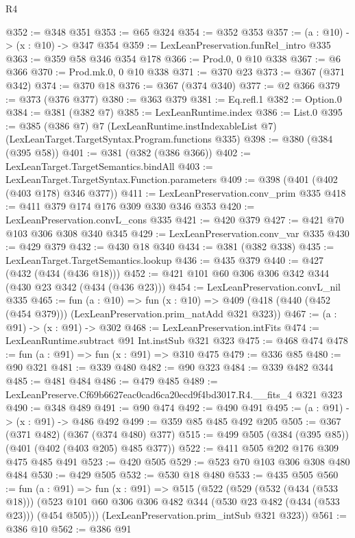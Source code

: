 \begin{lexlean}{R4}
\begin{coremodule}
@352 := @348 @351
@353 := @65 @324
@354 := @352 @353
@357 := (a : @10) -> (x : @10) -> @347 @354
@359 := LexLeanPreservation.funRel_intro @335
@363 := @359 @58 @346 @354 @178
@366 := Prod.{0, 0} @10 @338
@367 := @6 @366
@370 := Prod.mk.{0, 0} @10 @338
@371 := @370 @23
@373 := @367 (@371 @342)
@374 := @370 @18
@376 := @367 (@374 @340)
@377 := @2 @366
@379 := @373 (@376 @377)
@380 := @363 @379
@381 := Eq.refl.{1}
@382 := Option.{0}
@384 := @381 (@382 @7)
@385 := LexLeanRuntime.index
@386 := List.{0}
@395 := @385
    (@386 @7)
    @7
    (LexLeanRuntime.instIndexableList @7)
    (LexLeanTarget.TargetSyntax.Program.functions @335)
@398 := @380 (@384 (@395 @58))
@401 := @381 (@382 (@386 @366))
@402 := LexLeanTarget.TargetSemantics.bindAll
@403 := LexLeanTarget.TargetSyntax.Function.parameters
@409 := @398 (@401 (@402 (@403 @178) @346 @377))
@411 := LexLeanPreservation.conv_prim @335
@418 := @411 @379 @174 @176 @309 @330 @346 @353
@420 := LexLeanPreservation.convL_cons @335
@421 := @420 @379
@427 := @421 @70 @103 @306 @308 @340 @345
@429 := LexLeanPreservation.conv_var @335
@430 := @429 @379
@432 := @430 @18 @340
@434 := @381 (@382 @338)
@435 := LexLeanTarget.TargetSemantics.lookup
@436 := @435 @379
@440 := @427 (@432 (@434 (@436 @18)))
@452 := @421 @101 @60 @306 @306 @342 @344 (@430 @23 @342 (@434 (@436 @23)))
@454 := LexLeanPreservation.convL_nil @335
@465 := fun (a : @10) =>
  fun (x : @10) => @409 (@418 (@440 (@452 (@454 @379))) (LexLeanPreservation.prim_natAdd @321 @323))
@467 := (a : @91) -> (x : @91) -> @302
@468 := LexLeanPreservation.intFits
@474 := LexLeanRuntime.subtract @91 Int.instSub @321 @323
@475 := @468 @474
@478 := fun (a : @91) => fun (x : @91) => @310 @475
@479 := @336 @85
@480 := @90 @321
@481 := @339 @480
@482 := @90 @323
@484 := @339 @482 @344
@485 := @481 @484
@486 := @479 @485
@489 := LexLeanPreserve.Cf69b6627eac0cad6ca20ecd9f4bd3017.R4.__fits_4 @321 @323
@490 := @348 @489
@491 := @90 @474
@492 := @490 @491
@495 := (a : @91) -> (x : @91) -> @486 @492
@499 := @359 @85 @485 @492 @205
@505 := @367 (@371 @482) (@367 (@374 @480) @377)
@515 := @499 @505 (@384 (@395 @85)) (@401 (@402 (@403 @205) @485 @377))
@522 := @411 @505 @202 @176 @309 @475 @485 @491
@523 := @420 @505
@529 := @523 @70 @103 @306 @308 @480 @484
@530 := @429 @505
@532 := @530 @18 @480
@533 := @435 @505
@560 := fun (a : @91) =>
  fun (x : @91) =>
  @515
    (@522
      (@529
        (@532 (@434 (@533 @18)))
        (@523 @101 @60 @306 @306 @482 @344 (@530 @23 @482 (@434 (@533 @23))) (@454 @505)))
      (LexLeanPreservation.prim_intSub @321 @323))
@561 := @386 @10
@562 := @386 @91

\end{coremodule}
\end{lexlean}
